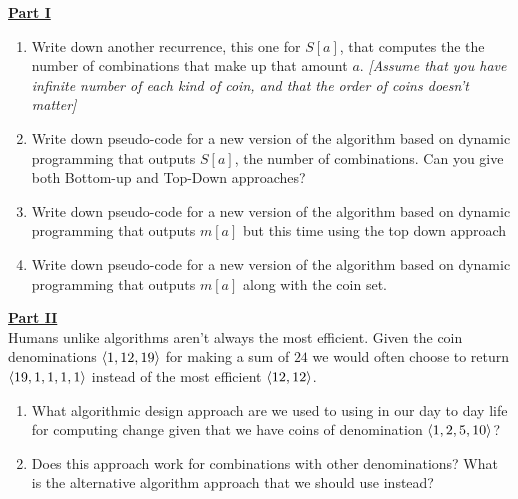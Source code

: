 \documentclass[10pt]{article}
\DeclarePairedDelimiter\angled{\langle}{\rangle}
\begin{document}
\begin{flushleft}
\begin{enumerate}[topsep=-10pt, itemsep=10pt]
\begin{codebox}
    \end{codebox}
    \underline{\textbf{Part I}}
    \begin{enumerate}[]
        \item Write down another recurrence, this one for $S[a]$, that computes the the number of combinations that make up that amount $a$. \textit{[Assume that you have infinite number of each kind of coin, and that the order of coins doesn’t matter]}
        \item Write down pseudo-code for a new version of the algorithm based on dynamic programming that outputs $S[a]$, the number of combinations. Can you give both Bottom-up and Top-Down approaches?
        \item Write down pseudo-code for a new version of the algorithm based on dynamic programming that outputs $m[a]$ but this time using the top down approach
        \item Write down pseudo-code for a new version of the algorithm based on dynamic programming that outputs $m[a]$ along with the coin set.
        \\
    \end{enumerate}
    \vspace{5mm}
    \underline{\textbf{Part II}}\\
    Humans unlike algorithms aren't always the most efficient. Given the coin denominations $\angled{1,12,19}$ for making a sum of $24$ we would often choose to return $\angled{19,1,1,1,1}$ instead of the most efficient $\angled{12,12}$. 
    \begin{enumerate}
        \item What algorithmic design approach are we used to using in our day to day life for computing change given that we have coins of denomination $\angled{1,2,5,10}$?
        \item Does this approach work for combinations with other denominations? What is the alternative algorithm approach that we should use instead? \textit{}
    \end{enumerate}
\end{enumerate}
\end{flushleft}
\end{document}
